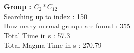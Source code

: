 \textbf{Group : $C_2*C_{12}$}\\
Searching up to index : 150\\
How many normal groups are found : 355\\
Total Time in s : 57.3\\
Total Magma-Time in s : 270.79\\
